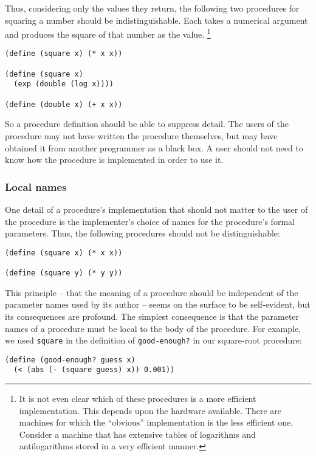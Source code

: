Thus, considering only the values they return, the following two
procedures for squaring a number should be indistinguishable.  Each
takes a numerical argument and produces the square of that number as
the value. \footnote{It is not even clear which of these procedures is
  a more efficient implementation.  This depends upon the hardware
  available.  There are machines for which the ``obvious''
  implementation is the less efficient one.  Consider a machine that
  has extensive tables of logarithms and antilogarithms stored in a
  very efficient manner.}

\begin{verbatim}
(define (square x) (* x x))

(define (square x) 
  (exp (double (log x))))

(define (double x) (+ x x))
\end{verbatim}

So a procedure definition should be able to suppress detail.  The
users of the procedure may not have written the procedure themselves,
but may have obtained it from another programmer as a black box.  A
user should not need to know how the procedure is implemented in order
to use it.

\subsubsection*{Local names}

One detail of a procedure's implementation that should not matter to
the user of the procedure is the implementer's choice of names for the
procedure's formal parameters.  Thus, the following procedures should
not be distinguishable:

\begin{verbatim}
(define (square x) (* x x))

(define (square y) (* y y))
\end{verbatim}

This principle -- that the meaning of a procedure should be independent
of the parameter names used by its author -- seems on the surface to be
self-evident, but its consequences are profound.  The simplest
consequence is that the parameter names of a procedure must be local
to the body of the procedure.  For example, we used \texttt{square} in
the definition of \texttt{good-enough?} in our square-root procedure:

\begin{verbatim}
(define (good-enough? guess x)
  (< (abs (- (square guess) x)) 0.001))
\end{verbatim}

